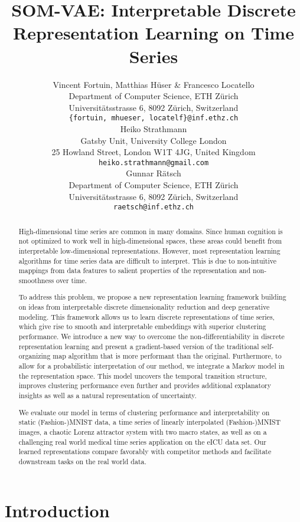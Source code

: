 \documentclass{article}
\title{SOM-VAE: Interpretable Discrete Representation Learning on Time Series}
\author{Vincent Fortuin, Matthias H\"user \& Francesco Locatello  \\
Department of Computer Science, ETH Z\"urich \\
Universit\"atsstrasse 6, 8092 Z\"urich, Switzerland \\
\texttt{\{fortuin, mhueser, locatelf\}@inf.ethz.ch} \\
\AND
Heiko Strathmann \\
Gatsby Unit, University College London \\
25 Howland Street, London W1T 4JG, United Kingdom \\
\texttt{heiko.strathmann@gmail.com} \\
\AND
Gunnar R\"atsch \\
Department of Computer Science, ETH Z\"urich \\
Universit\"atsstrasse 6, 8092 Z\"urich, Switzerland \\
\texttt{raetsch@inf.ethz.ch}
}
\date{}
\begin{document}
\maketitle

\begin{abstract}


High-dimensional time series are common in many domains.
Since human cognition is not optimized to work well in high-dimensional spaces, these areas could benefit from interpretable low-dimensional representations.
However, most representation learning algorithms for time series data are difficult to interpret.
This is due to non-intuitive mappings from data features to salient properties of the representation and non-smoothness over time.

To address this problem, we propose a new representation learning framework building on ideas from interpretable discrete dimensionality reduction and deep generative modeling.
This framework allows us to learn discrete representations of time series, which give rise to smooth and interpretable embeddings with superior clustering performance.
We introduce a new way to overcome the non-differentiability in discrete representation learning and present a gradient-based version of the traditional self-organizing map algorithm that is more performant than the original.
Furthermore, to allow for a probabilistic interpretation of our method, we integrate a Markov model in the representation space.
This model uncovers the temporal transition structure, improves clustering performance even further and provides additional explanatory insights as well as a natural representation of uncertainty.

We evaluate our model in terms of clustering performance and interpretability on static (Fashion-)MNIST data, a time series of linearly interpolated (Fashion-)MNIST images, a chaotic Lorenz attractor system with two macro states, as well as on a challenging real world medical time series application on the eICU data set.
Our learned representations compare favorably with competitor methods and facilitate downstream tasks on the real world data.

\end{abstract}
 
\section{Introduction}
\end{document}
